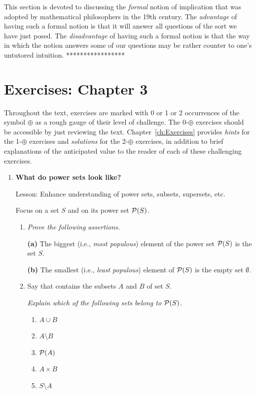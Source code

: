 {{This section is devoted to discussing the {\em formal} notion of implication that was adopted by mathematical philosophers in the 19th century.  The {\em advantage} of having such a formal notion is that it will answer all questions of the sort we have just posed.  The {\em disadvantage} of having such a formal notion is that the way in which the notion answers some of our questions may be rather counter to one's untutored intuition.
*****************}



\section{Exercises: Chapter 3}

Throughout the text, exercises are marked with 0 or 1 or 2 occurrences of the symbol $\oplus$ as a rough gauge of their level of challenge.  The 0-$\oplus$ exercises should be accessible by just reviewing the text.  Chapter~\ref{ch:Exercises} provides {\em hints} for the 1-$\oplus$ exercises and {\em solutions} for the 2-$\oplus$ exercises, in addition to brief explanations of the anticipated value to the reader of each of these challenging exercises. 

\begin{enumerate}
\item
{\bf What do power sets look like?}

{\sc Lesson:} Enhance understanding of power sets, subsets, supersets, etc.

\smallskip

Focus on a set $S$ and on its power set $\mbox{$\cal P$}(S)$.
  \begin{enumerate}
  \item
{\em Prove the following assertions.}

\begin{prop}
{\bf (a)}
The biggest (i.e., {\em most populous}) element of the power set $\mbox{$\cal P$}(S)$ is the set $S$.

{\bf (b)}
The smallest (i.e., {\em least populous}) element of $\mbox{$\cal P$}(S)$ is the empty set $\emptyset$.
\end{prop}

  \item
Say that contains the subsets $A$ and $B$ of set $S$.

{\em Explain which of the following sets belong to $\mbox{$\cal P$}(S)$.}
\begin{enumerate}
\item
$A \cup B$
\item
$A \setminus B$
\item
$\mbox{$\cal P$}(A)$
\item
$A \times B$
\item
$S \setminus A$
\end{enumerate}
  \end{enumerate}



\end{enumerate}}
